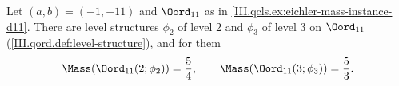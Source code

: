 Let $(a,b)=(-1,-11)$ and $\Oord_{11}$ as in \cref{III.qcls.ex:eichler-mass-instance-d11}. There are level structures $\phi_2$ of
level $2$ and $\phi_3$ of level $3$ on $\Oord_{11}$ (\cref{III.qord.def:level-structure}), and for them
\[
  \Mass(\Oord_{11}(2;\phi_2))=\frac54,\qquad \Mass(\Oord_{11}(3;\phi_3))=\frac53.
\]
